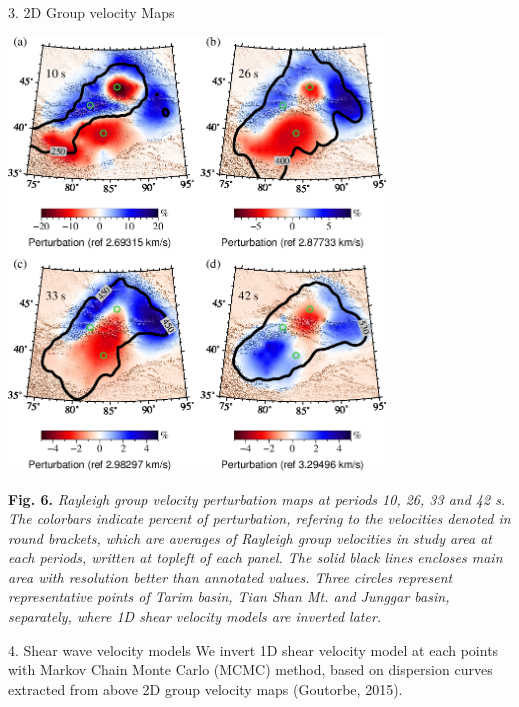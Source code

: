 \documentclass[
    landscape,      %
    paperwidth = 1120mm,
    paperheight = 820mm,
    fontscale = 0.45,
    margin = 1.7cm,
]{baposter}
\begin{document}
\begin{poster}
\begin{posterbox}[column=1]{3. 2D Group velocity Maps}
\begin{center}
\includegraphics[width=0.75\textwidth]{./images/maps.png}
\begin{minipage}{0.9\textwidth}
\footnotesize
\vspace{0.2em}
\textbf{Fig. 6.}
\itshape
Rayleigh group velocity perturbation maps at periods
10, 26, 33 and 42 s. The colorbars indicate percent of perturbation, refering to the velocities
denoted in round brackets, which are averages of Rayleigh group velocities in study area at each periods, written
at topleft of each panel. The solid black lines encloses main area with resolution better than
annotated values. Three circles represent representative points of Tarim basin, Tian Shan Mt.
and Junggar basin, separately, where 1D shear velocity models are inverted later.
\end{minipage}
\end{center}

\end{posterbox}

\begin{posterbox}[column=2 ]{4. Shear wave velocity models}
We invert 1D shear velocity model at each points with Markov Chain Monte
Carlo (MCMC) method, based on dispersion curves extracted from above 2D group velocity
maps (Goutorbe, 2015).


\end{posterbox}
\end{poster}
\end{document}
